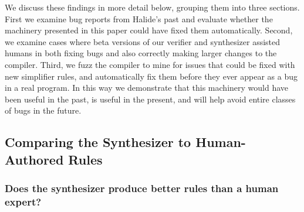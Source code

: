 \documentclass[acmsmall,review]{acmart}\settopmatter{printfolios=true,printccs=false,printacmref=false}
\newcommand{\jln}[1]{\textcolor{uwpurple}{\textit{[{#1} --JLN]}}}
\begin{document}
We discuss these findings in more detail below, grouping them into three sections. First we examine bug reports from Halide’s past and evaluate whether the machinery presented in this paper could have fixed them automatically. Second, we examine cases where beta versions of our verifier and synthesizer assisted humans in both fixing bugs and also correctly making larger changes to the compiler. Third, we fuzz the compiler to mine for issues that could be fixed with new simplifier rules, and automatically fix them before they ever appear as a bug in a real program. In this way we demonstrate that this machinery would have been useful in the past, is useful in the present, and will help avoid entire classes of bugs in the future.


\subsection{Comparing the Synthesizer to Human-Authored Rules}

\subsubsection{Does the synthesizer produce better rules than a human expert?}
\label{sub:bugfixes}



\end{document}
